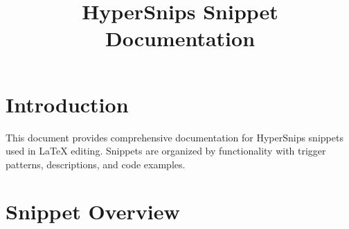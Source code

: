 \documentclass{article}
\title{HyperSnips Snippet Documentation}
\author{}
\date{}
\begin{document}
\maketitle

\section*{Introduction}
This document provides comprehensive documentation for HyperSnips snippets used in LaTeX editing. 
Snippets are organized by functionality with trigger patterns, descriptions, and code examples.

\tableofcontents

\section{Snippet Overview}
\end{document}
